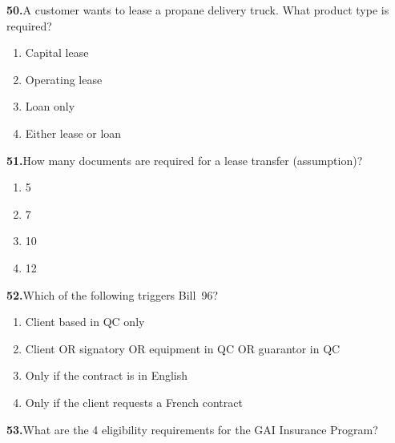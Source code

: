 \documentclass[11pt,letterpaper]{article}
\newif\ifshowsolutions
\newcommand{\answer}[1]{%
  \ifshowsolutions
    \begin{tcolorbox}[colback=green!5!white, colframe=answergreen, title={\small\textbf{Answer}}, fonttitle=\color{white}, coltitle=white, colbacktitle=answergreen, boxrule=0.5pt, arc=2pt, left=4pt, right=4pt, top=2pt, bottom=2pt]
    {\small #1}
    \end{tcolorbox}
  \fi
}
\begin{document}
\vspace{0.5em}

\noindent\textbf{50.}\quad A customer wants to lease a propane delivery truck. What product type is required?

\begin{enumerate}[label=\Alph*), leftmargin=2em, itemsep=0pt]
\item Capital lease
\item Operating lease
\item Loan only
\item Either lease or loan
\end{enumerate}
\answer{C) Loan only. Propane = hazmat. All hazmat and bus transactions = LOANS with increased insurance.}

\vspace{0.5em}

\noindent\textbf{51.}\quad How many documents are required for a lease transfer (assumption)?

\begin{enumerate}[label=\Alph*), leftmargin=2em, itemsep=0pt]
\item 5
\item 7
\item 10
\item 12
\end{enumerate}
\answer{C) 10: Appendix, PAD (Client B), E-Sign, IDs (both), Insurance (unless GAI), Void cheque (B), Credit decision, 1st page contract, IPC, REQ/Corp profile.}

\vspace{0.5em}

\noindent\textbf{52.}\quad Which of the following triggers Bill~96?

\begin{enumerate}[label=\Alph*), leftmargin=2em, itemsep=0pt]
\item Client based in QC only
\item Client OR signatory OR equipment in QC OR guarantor in QC
\item Only if the contract is in English
\item Only if the client requests a French contract
\end{enumerate}
\answer{B) Any of 4 triggers: client, signatory, equipment, or guarantor in QC.}

\vspace{0.5em}

\noindent\textbf{53.}\quad What are the 4 eligibility requirements for the GAI Insurance Program?
\end{document}
